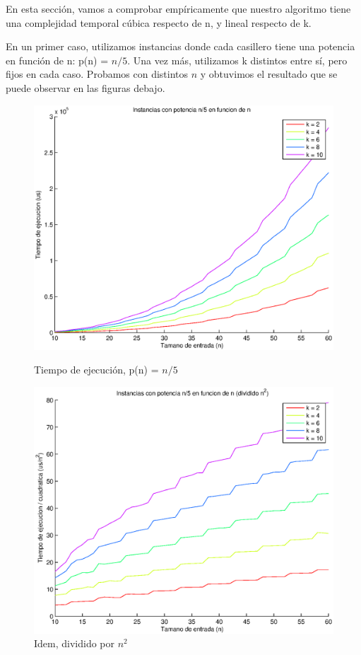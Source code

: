 En esta sección, vamos a comprobar empíricamente que nuestro algoritmo tiene una complejidad temporal cúbica respecto de n, y lineal respecto de k.

En un primer caso, utilizamos instancias donde cada casillero tiene una potencia en función de n: p(n) = $n/5$. Una vez más, utilizamos k distintos entre sí, pero fijos en cada caso. Probamos con distintos $n$ y obtuvimos el resultado que se puede observar en las figuras debajo.

\begin{figure}[H]
  \begin{minipage}{0.5\linewidth}
    \includegraphics[width=\linewidth]{img/problema3/instancia_p_20p_varios_k.eps}
    \caption{Tiempo de ejecución, p(n) = $n/5$}\label{fig:problema3-k-20}
  \end{minipage}
  \hfill
  \begin{minipage}{0.5\linewidth}
    \includegraphics[width=\linewidth]{img/problema3/instancia_p_20p_varios_k_div_n2.eps}
    \caption{Idem, dividido por $n^2$}\label{fig:problema3-k-n2-20}
  \end{minipage}	
\end{figure}


